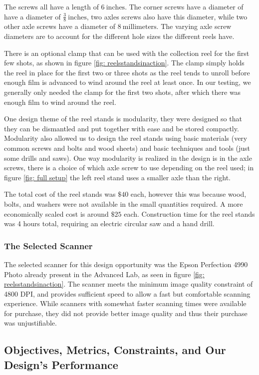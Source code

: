 \documentclass[12pt]{article} %
\begin{document}
The screws all have  a length of  $6 \ \text{inches}$. The corner screws have a diameter of have a diameter of $\frac{3}{8} \ \text{inches}$, two axles screws also have this diameter, while two other axle screws have a diameter of $8 \ \text{millimeters}$. The varying axle screw diameters are to account for the different hole sizes the different reels have.

There is an optional clamp that can be used with the collection reel for the first few shots, as shown in figure \ref{fig: reelsstandsinaction}. The clamp simply holds the reel in place for the first two or three shots as the reel tends to unroll before enough film is advanced to wind around the reel at least once. In our testing, we generally only needed the clamp for the first two shots, after which there was enough film to wind around the reel.

One design theme of the reel stands is modularity, they were designed so that they can be dismantled and put together with ease and be stored compactly. Modularity also allowed us to design the reel stands using basic materials (very common screws and bolts and wood sheets) and basic techniques and tools (just some drills and saws). One way modularity is realized in the design is in the axle screws, there is a choice of which axle screw to use depending on the reel used; in figure \ref{fig: full setup} the left reel stand uses a smaller axle than the right.

The total cost of the reel stands was $\$40$ each, however this was because wood, bolts, and washers were not available in the small quantities required. A more economically scaled cost is around $\$25$ each. Construction time for the reel stands was 4 hours total, requiring an electric circular saw and a hand drill.

\subsubsection{The Selected Scanner}
The selected scanner for this design opportunity was the Epson Perfection 4990 Photo already present in the Advanced Lab, as seen in figure \ref{fig: reelsstandsinaction}. The scanner meets the minimum image quality constraint of 4800 DPI, and provides sufficient speed to allow a fast but comfortable scanning experience. While scanners with somewhat faster scanning times were available for purchase, they did not provide better image quality and thus their purchase was unjustifiable. 

\subsection{Objectives, Metrics, Constraints, and Our Design's Performance}
\end{document}
